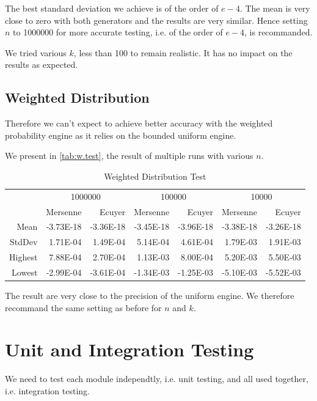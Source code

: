 \documentclass[12pt,a4paper,article]{memoir} %
\begin{document}
The best standard deviation we achieve is of the order of $e-4$.
The mean is very close to zero with both generators and the results 
are very similar.
Hence setting $n$ to 1000000 for more accurate testing, 
i.e. of the order of $e-4$, is recommanded.

We tried various $k$, less than 100 to remain realistic. It has no impact on the
results as expected.

\subsection{Weighted Distribution}

Therefore we can't expect to achieve better accuracy with the
weighted probability engine as it relies on the bounded uniform engine.

We present in \autoref{tab:w.test}, the result of multiple runs with various $n$.
\begin{table}[htbp!]
  \centering \tiny
    \begin{tabular}{r|rrrrrr}
    \multicolumn{1}{r}{} & \multicolumn{2}{c}{1000000} & \multicolumn{2}{c}{100000} & \multicolumn{2}{c}{10000} \\
    \multicolumn{1}{r}{} & Mersenne & Ecuyer & Mersenne & Ecuyer & Mersenne & Ecuyer \\
\cmidrule{2-7}    Mean  & -3.73E-18 & -3.36E-18 & -3.45E-18 & -3.96E-18 & -3.38E-18 & -3.26E-18 \\
    StdDev  & 1.71E-04 & 1.49E-04 & 5.14E-04 & 4.61E-04 & 1.79E-03 & 1.91E-03 \\
    Highest  & 7.88E-04 & 2.70E-04 & 1.13E-03 & 8.00E-04 & 5.20E-03 & 5.50E-03 \\
    Lowest  & -2.99E-04 & -3.61E-04 & -1.34E-03 & -1.25E-03 & -5.10E-03 & -5.52E-03 \\
    \end{tabular}%
  \caption{Weighted Distribution Test}
  \label{tab:w.test}%
\end{table}%
The result are very close to the precision of the uniform engine. 
We therefore recommand the same setting as before for $n$ and $k$.

\section{Unit and Integration Testing}
We need to test each module independtly, i.e. unit testing, and all used 
together, i.e. integration testing.
\end{document}

